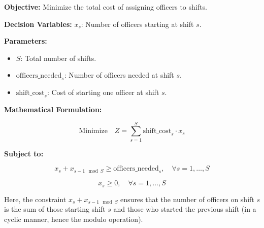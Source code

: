 \documentclass{article}
\begin{document}
\textbf{Objective:}
Minimize the total cost of assigning officers to shifts.

\textbf{Decision Variables:}
\( x_s \): Number of officers starting at shift \( s \).

\textbf{Parameters:}
\begin{itemize}
    \item \( S \): Total number of shifts.
    \item \( \text{officers\_needed}_s \): Number of officers needed at shift \( s \).
    \item \( \text{shift\_cost}_s \): Cost of starting one officer at shift \( s \).
\end{itemize}

\textbf{Mathematical Formulation:}

\[
\text{Minimize} \quad Z = \sum_{s=1}^{S} \text{shift\_cost}_s \cdot x_s
\]

\textbf{Subject to:}

\[
x_s + x_{s-1 \mod S} \geq \text{officers\_needed}_s, \quad \forall s = 1, \ldots, S
\]

\[
x_s \geq 0, \quad \forall s = 1, \ldots, S
\]

Here, the constraint \( x_s + x_{s-1 \mod S} \) ensures that the number of officers on shift \( s \) is the sum of those starting shift \( s \) and those who started the previous shift (in a cyclic manner, hence the modulo operation).
\end{document}
